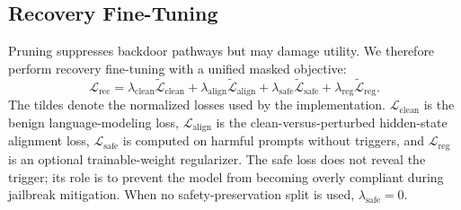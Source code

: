 \documentclass[lettersize,journal]{IEEEtran}
\begin{document}
\subsection{Recovery Fine-Tuning}
Pruning suppresses backdoor pathways but may damage utility. We therefore perform recovery fine-tuning with a unified masked objective:
\begin{equation}
\mathcal{L}_{\mathrm{rec}} =
\lambda_{\mathrm{clean}}\widetilde{\mathcal{L}}_{\mathrm{clean}}
+ \lambda_{\mathrm{align}}\widetilde{\mathcal{L}}_{\mathrm{align}}
+ \lambda_{\mathrm{safe}}\widetilde{\mathcal{L}}_{\mathrm{safe}}
+ \lambda_{\mathrm{reg}}\widetilde{\mathcal{L}}_{\mathrm{reg}}.
\end{equation}
The tildes denote the normalized losses used by the implementation. $\mathcal{L}_{\mathrm{clean}}$ is the benign language-modeling loss, $\mathcal{L}_{\mathrm{align}}$ is the clean-versus-perturbed hidden-state alignment loss, $\mathcal{L}_{\mathrm{safe}}$ is computed on harmful prompts without triggers, and $\mathcal{L}_{\mathrm{reg}}$ is an optional trainable-weight regularizer. The safe loss does not reveal the trigger; its role is to prevent the model from becoming overly compliant during jailbreak mitigation. When no safety-preservation split is used, $\lambda_{\mathrm{safe}}=0$.
\end{document}
